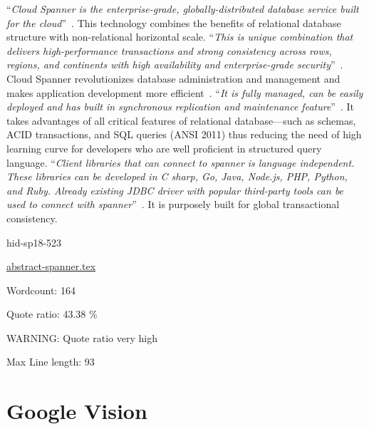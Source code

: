 \color{blue}``\emph{Cloud Spanner is the enterprise-grade, globally-distributed database 
service built for the cloud}''\color{black}~\cite{hid-sp18-523-www-google-spanner}. 
This technology combines the benefits of relational database structure 
with non-relational horizontal scale. \color{blue}``\emph{This is unique combination that 
delivers high-performance transactions and strong consistency across rows, 
regions, and continents with high availability and enterprise-grade 
security}''\color{black}~\cite{hid-sp18-523-www-google-spanner}. Cloud Spanner 
revolutionizes database administration and management and makes 
application development more efficient~\cite{hid-sp18-523-www-google-spanner}.
\color{blue}``\emph{It is fully managed, can be easily deployed and has built in synchronous 
replication and maintenance feature}''\color{black}~\cite{hid-sp18-523-www-google-spanner}. 
It takes advantages of all critical features of relational database—such 
as schemas, ACID transactions, and SQL queries (ANSI 2011) thus reducing 
the need of high learning curve for developers who are well proficient in 
structured query language. 
\color{blue}``\emph{Client libraries that can connect to spanner is language independent. 
These libraries can be developed in C sharp, Go, Java, Node.js, PHP, Python, 
and Ruby. Already existing JDBC driver with popular third-party tools can be 
used to connect with spanner}''\color{black}~\cite{hid-sp18-523-www-google-spanner}. It is 
purposely built for global transactional consistency.


\begin{IU}

hid-sp18-523

\href{https://github.com/cloudmesh-community/hid-sp18-523/blob/master//technology/abstract-spanner.tex}{abstract-spanner.tex}

 

Wordcount: 164


Quote ratio: 43.38 \%

WARNING: Quote ratio very high
 
Max Line length: 93
\end{IU}

\section{Google Vision}

